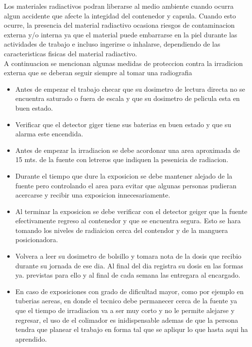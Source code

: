 \documentclass[11pt, oneside]{book}
\begin{document}
Los materiales radiactivos podran liberarse al medio ambiente
cuando ocurra algun accidente que afecte la integidad del
contenedor y capsula. Cuando esto ocurre, la presencia del
material radiactivo ocasiona riesgos de contaminacion externa
y/o interna ya que el material puede embarrarse en la piel
durante las actividades de trabajo e incluso ingerirse o
inhalarse, dependiendo de las caracteristicas fisicas del
material radiactivo. \\

A continuacion se mencionan algunas medidas de proteccion contra
la irradicion externa que se deberan seguir siempre al tomar
una radiografia
\begin{itemize}
\item Antes de empezar el trabajo checar que su dosimetro de lectura
directa no se encuentra saturado o fuera de escala y que
su dosimetro de pelicula esta en buen estado.

\item Verificar que el detector giger tiene sus baterias en buen
estado y que su alarma este encendida.

\item Antes de empezar la irradiacion se debe acordonar una area
aproximada de 15 mts. de la fuente con letreros que indiquen
la pesenicia de radiacion.

\item Durante el tiempo que dure la exposicion se debe mantener
alejado de la fuente pero controlando el area para evitar
que algunas personas pudieran acercarse y recibir una
exposicion innecesariamente.

\item Al terminar la exposicion se debe verificar con el detector
geiger que la fuente efectivamente regreso al contenedor
y que se encuentra segura. Esto se hara tomando los niveles
de radiaicion cerca del contendor y de la manguera
posicionadora.

\item Volvera a leer su dosimetro de bolsillo y tomara nota de
la dosis que recibio durante su jornada de ese dia. Al final
del dia registra su dosis en las formas ya.  previstas para
ello y al final de cada semana las entregara al encargado.

\item En caso de exposiciones con grado de dificultad mayor, como
por ejemplo en tuberias aereas, en donde el tecnico debe
permanecer cerca de la fuente ya que el tiempo de irradiacion
va a ser muy corto y no le permite alejarse y regresar, el
uso de el colimador es inidispensable ademas de que la persona
tendra que planear el trabajo en forma tal que se apliqur
lo que hasta aqui ha aprendido.
\end{itemize}
\end{document}

